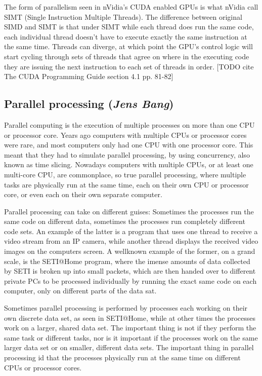The form of parallelism seen in nVidia's CUDA enabled GPUs is what nVidia call SIMT (Single Instruction Multiple Threads). The difference between original SIMD and SIMT is that under SIMT while each thread does run the same code, each individual thread doesn't have to execute exactly the same instruction at the same time. Threads can diverge, at which point the GPU's control logic will start cycling through sets of threads that agree on where in the executing code they are issuing the next instruction to each set of threads in order. [TODO cite The CUDA Programming Guide section 4.1 pp. 81-82]

\subsection{Parallel processing (\textit{Jens Bang})}

Parallel computing is the execution of multiple processes on more than one CPU or processor core. Years ago computers with multiple CPUs or processor cores were rare, and most computers only had one CPU with one processor core. This meant that they had to simulate parallel processing, by using concurrency, also known as time slicing. Nowadays computers with multiple CPUs, or at least one multi-core CPU, are commonplace, so true parallel processing, where multiple tasks are physically run at the same time, each on their own CPU or processor core, or even each on their own separate computer.

Parallel processing can take on different guises: Sometimes the processes run the same code on different data, sometimes the processes run completely different code sets. An example of the latter is a program that uses one thread to receive a video stream from an IP camera, while another thread displays the received video images on the computers screen. A wellknown example of the former, on a grand scale, is the SETI@Home program, where the imense amounts of data collected by SETI is broken up into small packets, which are then handed over to different private PCs to be processed individually by running the exact same code on each computer, only on different parts of the data sat.

Sometimes parallel processing is performed by processes each working on their own discrete data set, as seen in SETI@Home, while at other times the processes work on a larger, shared data set. The important thing is not if they perform the same task or different tasks, nor is it important if the processes work on the same larger data set or on smaller, different data sets. The important thing in parallel processing id that the processes physically run at the same time on different CPUs or processor cores.


